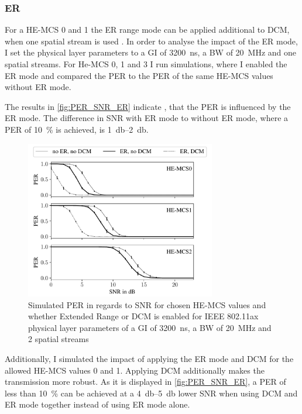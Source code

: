 \subsubsection*{\acf{ER}}
For a HE-MCS \num{0} and \num{1} the \ac{ER} range mode can be applied additional to \ac{DCM}, when one spatial stream is used \cite{noauthor_ieee_2021}.
In order to analyse the impact of the \ac{ER} mode, I set the physical layer parameters to a \ac{GI} of
\SI{3200}{\nano\second}, a \ac{BW} of \SI{20}{\mega\hertz} and one spatial streams. For He-MCS \num{0}, \num{1} and \num{3} I run simulations, where I enabled the
\ac{ER} mode and compared the \ac{PER} to the \ac{PER} of the same HE-MCS values without \ac{ER} mode.

The results in \autoref{fig:PER_SNR_ER} indicate , that the \ac{PER} is influenced by the \ac{ER} mode.
The difference in \ac{SNR} with \ac{ER} mode to without \ac{ER} mode, where a \ac{PER}
of \SI{10}{\percent} is achieved, is \SIrange{1}{2}{\decibel}.

\begin{figure}%
	\centering
	\includegraphics[width=0.74\textwidth]{figures/ER_PER_to_SNR.pdf}
	\caption{Simulated \ac{PER} in regards to \ac{SNR} for chosen HE-\ac{MCS} values and whether Extended Range or \ac{DCM}
	is enabled for IEEE 802.11ax physical layer parameters of a \ac{GI} of \SI{3200}{\nano\second}, a \ac{BW} of \SI{20}{\mega\hertz} and 2 spatial streams}
	\label{fig:PER_SNR_ER}%
\end{figure}

Additionally, I simulated the impact of applying the \ac{ER} mode and \ac{DCM} for the allowed HE-MCS values \num{0} and \num{1}.
Applying \ac{DCM} additionally makes the transmission more robust. As it is displayed in \autoref{fig:PER_SNR_ER},
a \ac{PER} of less than \SI{10}{\percent} can be achieved at a \SIrange{4}{5}{\decibel} lower \ac{SNR} when using \ac{DCM} and \ac{ER} mode together instead
of using \ac{ER} mode alone.

